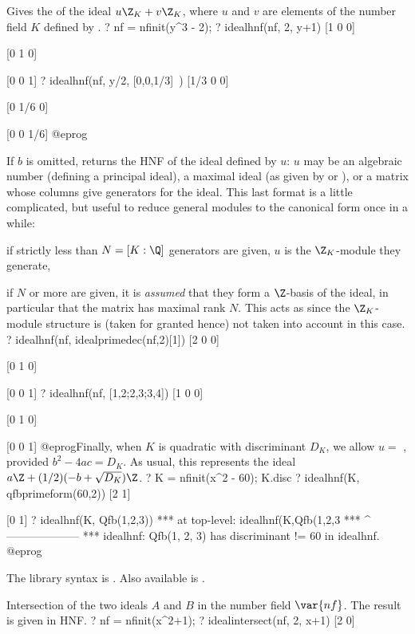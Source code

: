 \label{se:idealhnf}
Gives the  of the ideal $u\Z_K+v\Z_K$, where $u$
and $v$ are elements of the number field $K$ defined by .
\bprog
? nf = nfinit(y^3 - 2);
? idealhnf(nf, 2, y+1)
[1 0 0]

[0 1 0]

[0 0 1]
? idealhnf(nf, y/2, [0,0,1/3]~)
[1/3 0 0]

[0 1/6 0]

[0 0 1/6]
@eprog

If $b$ is omitted, returns the HNF of the ideal defined by $u$: $u$ may be an
algebraic number (defining a principal ideal), a maximal ideal (as given by
 or ), or a matrix whose columns give
generators for the ideal. This last format is a little complicated, but
useful to reduce general modules to the canonical form once in a while:

\item if strictly less than $N = [K:\Q]$ generators are given, $u$
is the $\Z_K$-module they generate,

\item if $N$ or more are given, it is \emph{assumed} that they form a
$\Z$-basis of the ideal, in particular that the matrix has maximal rank $N$.
This acts as  since the $\Z_K$-module structure is (taken for
granted hence) not taken into account in this case.
\bprog
? idealhnf(nf, idealprimedec(nf,2)[1])
[2 0 0]

[0 1 0]

[0 0 1]
? idealhnf(nf, [1,2;2,3;3,4])
[1 0 0]

[0 1 0]

[0 0 1]
@eprog\noindent Finally, when $K$ is quadratic with discriminant $D_K$, we
allow $u =$ , provided $b^2 - 4ac = D_K$. As usual,
this represents the ideal $a \Z + (1/2)(-b + \sqrt{D_K}) \Z$.
\bprog
? K = nfinit(x^2 - 60); K.disc
? idealhnf(K, qfbprimeform(60,2))
[2 1]

[0 1]
? idealhnf(K, Qfb(1,2,3))
  ***   at top-level: idealhnf(K,Qfb(1,2,3
  ***                 ^--------------------
  *** idealhnf: Qfb(1, 2, 3) has discriminant != 60 in idealhnf.
@eprog

The library syntax is .
Also available is .

\label{se:idealintersect}
Intersection of the two ideals
$A$ and $B$ in the number field $\var{nf}$. The result is given in HNF.
\bprog
? nf = nfinit(x^2+1);
? idealintersect(nf, 2, x+1)
[2 0]

